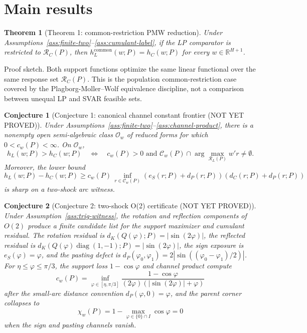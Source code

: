 \documentclass[11pt]{article}
\newcommand{\R}{\mathbb{R}}
\theoremstyle{definition}
\theoremstyle{plain}
\newtheorem{theorem}{Theorem}
\newtheorem{conjecture}{Conjecture}
\theoremstyle{remark}
\begin{document}
\section{Main results}
\begin{theorem}[Theorem 1: common-restriction PMW reduction]\label{thm:pmw-common}
Under Assumptions~\ref{ass:finite-two}--\ref{ass:cumulant-label}, if the LP comparator is restricted to \(\mathcal R_C(P)\), then \(h_L^{\mathrm{common}}(w;P)=h_C(w;P)\) for every \(w\in\R^{H+1}\).
\end{theorem}
Proof sketch. Both support functions optimize the same linear functional over the same response set \(\mathcal R_C(P)\). This is the population common-restriction case covered by the Plagborg-Moller--Wolf equivalence discipline, not a comparison between unequal LP and SVAR feasible sets.

\begin{conjecture}[Conjecture 1: canonical channel constant frontier (NOT YET PROVED)]\label{conj:cw-frontier}
Under Assumptions~\ref{ass:finite-two}--\ref{ass:channel-product}, there is a nonempty open semi-algebraic class \(\mathcal O_w\) of reduced forms for which \(0<c_w(P)<\infty\). On \(\mathcal O_w\),
\[
h_L(w;P)>h_C(w;P)
\quad\Longleftrightarrow\quad
c_w(P)>0\text{ and }\mathcal C_w(P)\cap\arg\max_{\mathcal R_L(P)}w'r\ne\emptyset .
\]
Moreover, the lower bound
\[
h_L(w;P)-h_C(w;P)\ge c_w(P)\,
\inf_{r\in\mathcal C_w(P)}(e_S(r;P)+d_P(r;P))(d_C(r;P)+d_P(r;P))
\]
is sharp on a two-shock arc witness.
\end{conjecture}

\begin{conjecture}[Conjecture 2: two-shock O(2) certificate (NOT YET PROVED)]\label{conj:o2-certificate}
Under Assumption~\ref{ass:trig-witness}, the rotation and reflection components of \(O(2)\) produce a finite candidate list for the support maximizer and cumulant residual. The rotation residual is \(d_K(Q(\varphi);P)=|\sin(2\varphi)|\), the reflected residual is \(d_K(Q(\varphi)\operatorname{diag}(1,-1);P)=|\sin(2\varphi)|\), the sign exposure is \(e_S(\varphi)=\varphi\), and the pasting defect is \(d_P(\varphi_0,\varphi_1)=2|\sin((\varphi_0-\varphi_1)/2)|\). For \(\eta\le\varphi\le\pi/3\), the support loss \(1-\cos\varphi\) and channel product compute
\[
c_w(P)=
\inf_{\varphi\in[\eta,\pi/3]}
\frac{1-\cos\varphi}{(2\varphi)(|\sin(2\varphi)|+\varphi)}
\]
after the small-arc distance convention \(d_P(\varphi,0)=\varphi\), and the parent corner collapses to
\[
\chi_w(P)=1-\max_{\varphi\in\{0\}\cap I}\cos\varphi=0
\]
when the sign and pasting channels vanish.
\end{conjecture}
\end{document}
